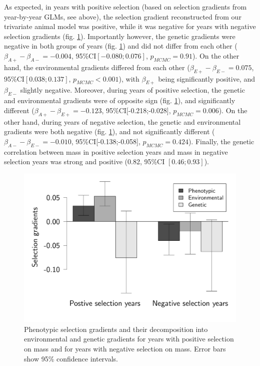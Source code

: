 As expected, in years with positive selection (based on selection gradients from year-by-year GLMs, see above), the selection gradient reconstructed from our trivariate animal model was positive, while it was negative for years with negative selection gradients (fig. \ref{fig:betas}). Importantly however, the genetic gradients were negative in both groups of years (fig. \ref{fig:betas}) and did not differ from each other ($\beta_{A+}-\beta_{A-} = -0.004$, 95\%CI$ [-0.080;0.076]$, $p_{MCMC}=0.91$). On the other hand, the environmental gradients differed from each other ($\beta_{E+}-\beta_{E-} = 0.075$, 95\%CI$ [0.038;0.137]$, $p_{MCMC}<0.001$), with $\beta_{E+}$ being significantly positive, and $\beta_{E-}$ slightly negative.
Moreover, during years of positive selection, the genetic and environmental gradients were of opposite sign (fig. \ref{fig:betas}), and significantly different ($\beta_{A+}-\beta_{E+} = -0.123$, 95\%CI[-0.218;-0.028], $p_{MCMC}=0.006$).
On the other hand, during years of negative selection, the genetic and environmental gradients were both negative (fig. \ref{fig:betas}), and not significantly different ($\beta_{A-}-\beta_{E-} = -0.010$, 95\%CI[-0.138;-0.058], $p_{MCMC}=0.424$). Finally, the genetic correlation between mass in positive selection years and mass in negative selection years was strong and positive (0.82, 95\%CI $[0.46; 0.93]$).

\begin{figure}[ht]
\includegraphics[width=\textwidth]{FiguresFluSel/Betas-1}
\caption{Phenotypic selection gradients and their decomposition into environmental and genetic gradients for years with positive selection on mass and for years with negative selection on mass. Error bars show 95\% confidence intervals.}
\label{fig:betas}
\end{figure}

